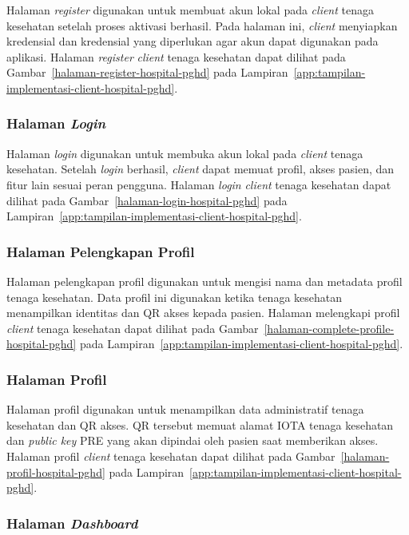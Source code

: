 Halaman \textit{register} digunakan untuk membuat akun lokal pada \textit{client} tenaga kesehatan setelah proses aktivasi berhasil. 
Pada halaman ini, \textit{client} menyiapkan kredensial dan kredensial yang diperlukan agar akun dapat digunakan pada aplikasi.
Halaman \textit{register} \textit{client} tenaga kesehatan dapat dilihat pada Gambar~\ref{halaman-register-hospital-pghd} pada Lampiran~\ref{app:tampilan-implementasi-client-hospital-pghd}.

\subsubsection{Halaman \textit{Login}}

Halaman \textit{login} digunakan untuk membuka akun lokal pada \textit{client} tenaga kesehatan. 
Setelah \textit{login} berhasil, \textit{client} dapat memuat profil, akses pasien, dan fitur lain sesuai peran pengguna.
Halaman \textit{login} \textit{client} tenaga kesehatan dapat dilihat pada Gambar~\ref{halaman-login-hospital-pghd} pada Lampiran~\ref{app:tampilan-implementasi-client-hospital-pghd}.

\subsubsection{Halaman Pelengkapan Profil}

Halaman pelengkapan profil digunakan untuk mengisi nama dan metadata profil tenaga kesehatan. 
Data profil ini digunakan ketika tenaga kesehatan menampilkan identitas dan QR akses kepada pasien.
Halaman melengkapi profil \textit{client} tenaga kesehatan dapat dilihat pada Gambar~\ref{halaman-complete-profile-hospital-pghd} pada Lampiran~\ref{app:tampilan-implementasi-client-hospital-pghd}.

\subsubsection{Halaman Profil}

Halaman profil digunakan untuk menampilkan data administratif tenaga kesehatan dan QR akses. 
QR tersebut memuat alamat IOTA tenaga kesehatan dan \textit{public key} PRE yang akan dipindai oleh pasien saat memberikan akses.
Halaman profil \textit{client} tenaga kesehatan dapat dilihat pada Gambar~\ref{halaman-profil-hospital-pghd} pada Lampiran~\ref{app:tampilan-implementasi-client-hospital-pghd}.

\subsubsection{Halaman \textit{Dashboard}}


